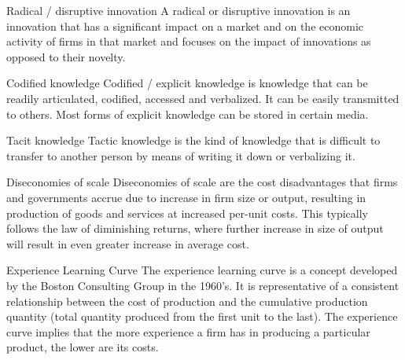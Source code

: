 \begin{sortEnvironment}{Radical / disruptive innovation}
A radical or disruptive innovation is an innovation that has a significant impact on a market and on the economic activity of firms in that market and focuses on the impact of innovations as opposed to their novelty. 
\end{sortEnvironment}

\begin{sortEnvironment}{Codified knowledge}
Codified / explicit knowledge is knowledge that can be readily articulated, codified, accessed and verbalized. It can be easily transmitted to others. Most forms of explicit knowledge can be stored in certain media. 
\end{sortEnvironment}

\begin{sortEnvironment}{Tacit knowledge} 
Tactic knowledge is the kind of knowledge that is difficult to transfer to another person by means of writing it down or verbalizing it.
\end{sortEnvironment}

\begin{sortEnvironment}{Diseconomies of scale}
Diseconomies of scale are the cost disadvantages that firms and governments accrue due to increase in firm size or output, resulting in production of goods and services at increased per-unit costs. This typically follows the law of diminishing returns, where further increase in size of output will result in even greater increase in average cost.
\end{sortEnvironment}

\begin{sortEnvironment}{Experience Learning Curve}
The experience learning curve is a concept developed by the Boston Consulting Group in the 1960's. It is representative of a consistent relationship between the cost of production and the cumulative production quantity (total quantity produced from the first unit to the last). The experience curve implies that the more experience a firm has in producing a particular product, the lower are its costs.
\end{sortEnvironment}